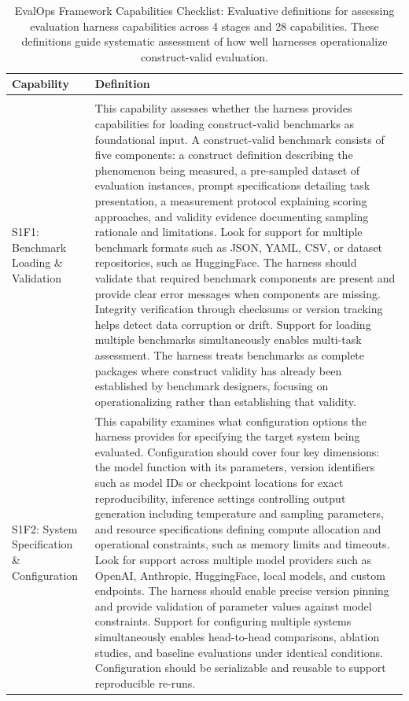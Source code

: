 \setlength{\LTleft}{-2cm}
\begin{longtable}{>{\raggedright\arraybackslash}p{3cm}|>{\raggedright\arraybackslash}p{16cm}}
\caption{EvalOps Framework Capabilities Checklist: Evaluative definitions for assessing evaluation harness capabilities across 4 stages and 28 capabilities. These definitions guide systematic assessment of how well harnesses operationalize construct-valid evaluation.} \label{tab:evalops-checklist} \\
\hline
\textbf{Capability} & \textbf{Definition} \\
\hline

\multicolumn{2}{l}{\textbf{STAGE 1: CONFIGURE -- Evaluation Setup \& Specification (8 capabilities)}} \\
\hline

S1F1: Benchmark Loading \& Validation & This capability assesses whether the harness provides capabilities for loading construct-valid benchmarks as foundational input. A construct-valid benchmark consists of five components: a construct definition describing the phenomenon being measured, a pre-sampled dataset of evaluation instances, prompt specifications detailing task presentation, a measurement protocol explaining scoring approaches, and validity evidence documenting sampling rationale and limitations. Look for support for multiple benchmark formats such as JSON, YAML, CSV, or dataset repositories, such as HuggingFace. The harness should validate that required benchmark components are present and provide clear error messages when components are missing. Integrity verification through checksums or version tracking helps detect data corruption or drift. Support for loading multiple benchmarks simultaneously enables multi-task assessment. The harness treats benchmarks as complete packages where construct validity has already been established by benchmark designers, focusing on operationalizing rather than establishing that validity. \\
\hline

S1F2: System Specification \& Configuration & This capability examines what configuration options the harness provides for specifying the target system being evaluated. Configuration should cover four key dimensions: the model function with its parameters, version identifiers such as model IDs or checkpoint locations for exact reproducibility, inference settings controlling output generation including temperature and sampling parameters, and resource specifications defining compute allocation and operational constraints, such as memory limits and timeouts. Look for support across multiple model providers such as OpenAI, Anthropic, HuggingFace, local models, and custom endpoints. The harness should enable precise version pinning and provide validation of parameter values against model constraints. Support for configuring multiple systems simultaneously enables head-to-head comparisons, ablation studies, and baseline evaluations under identical conditions. Configuration should be serializable and reusable to support reproducible re-runs. \\
\hline


\end{longtable}

